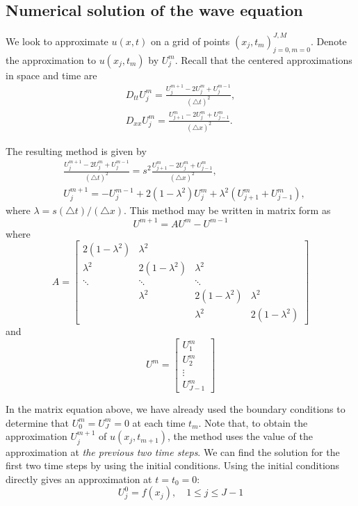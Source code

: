 \subsection*{Numerical solution of the wave equation}
We look to approximate $u(x,t)$ on a grid of points $(x_j,t_m)_{j=0,m=0}^{J,M}$.
Denote the approximation to $u(x_j,t_m)$ by $U_{j}^{m}$.
Recall that the centered approximations in space and time are
\begin{align*}
D_{tt} U_{j}^{m} = \frac{U_{j}^{m+1} -2 U_{j}^{m} + U_{j}^{m-1}}{(\triangle t)^2} ,\\
D_{xx} U_{j}^{m} = \frac{U_{j+1}^{m} -2 U_{j}^{m} + U_{j-1}^{m}}{(\triangle x)^2} .
\end{align*}

The resulting method is given by
\begin{align*}
	&\frac{U_{j}^{m+1} -2 U_{j}^{m} + U_{j}^{m-1}}{(\triangle t)^2} = s^2 \frac{U_{j+1}^{m} -2 U_{j}^{m} + U_{j-1}^{m}}{(\triangle x)^2}, \\
	&U_{j}^{m+1} =  - U_{j}^{m-1} + 2 (1-\lambda^2) U_{j}^{m} + \lambda ^2 (U_{j+1}^{m} + U_{j-1}^{m}),
\end{align*}
where $ \lambda  =  s(\triangle t)/(\triangle x)$.
This method may be written in matrix form as
\[U^{m+1} = AU^{m} - U^{m-1} \]
where
\[A =
\left[\begin{array}{cccc}2(1-\lambda^2) & \lambda^2 &  &  \\ \lambda^2 & 2(1-\lambda^2) & \lambda^2 &  \\ \ddots & \ddots & \ddots &  \\ & \lambda^2 & 2(1-\lambda^2) & \lambda^2 \\  &  & \lambda^2 & 2(1-\lambda^2)\end{array}\right]\]
and
\[U^m = \left[\begin{array}{c}U_{1}^{m} \\U_{2}^{m} \\\vdots \\U_{J-1}^{m}\end{array}\right]\]

In the matrix equation above, we have already used the boundary conditions to determine that $U_{0}^{m} = U_{J}^{m} = 0$ at each time $t_m$.
Note that, to obtain the approximation $U_{j}^{m+1}$ of $u(x_j,t_{m+1})$, the method uses the value of the approximation at \emph{the previous two time steps}.
We can find the solution for the first two time steps by using the initial conditions.
Using the initial conditions directly gives an approximation at $t = t_0 = 0:$
\[U_{j}^{0} = f(x_j), \quad 1 \leq j \leq J-1\]

